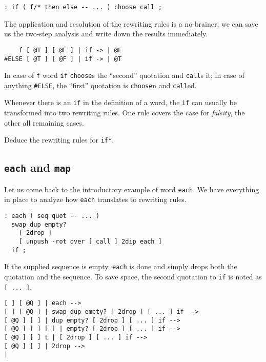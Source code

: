 \begin{verbatim}
: if ( f/* then else -- ... ) choose call ;
\end{verbatim}

The application and resolution of the rewriting rules is a no-brainer; we can save us the two-step analysis and write down the results immediately.

\begin{verbatim}
    f [ @T ] [ @F ] | if -> | @F
#ELSE [ @T ] [ @F ] | if -> | @T
\end{verbatim}

In case of \verb|f| word \verb|if| \verb|choose|s the ``second'' quotation and \verb|call|s it; in case of anything \verb|#ELSE|, the ``first'' quotation is \verb|choose|n and \verb|call|ed.

Whenever there is an \verb|if| in the definition of a word, the \verb|if| can usually be transformed into two rewriting rules. One rule covers the case for \emph{falsity}, the other all remaining cases.

\begin{exercise}\label{ex:if*}
Deduce the rewriting rules for \verb|if*|.
\end{exercise}

\subsection{\texttt{each} and \texttt{map}}

Let us come back to the introductory example of word \verb|each|. We have everything in place to analyze how \verb|each| translates to rewriting rules.

\begin{verbatim}
: each ( seq quot -- ... )
  swap dup empty?
    [ 2drop ]
    [ unpush -rot over [ call ] 2dip each ]
  if ;
\end{verbatim}

If the supplied sequence is empty, \verb|each| is done and simply drops both the quotation and the sequence. To save space, the second quotation to \verb|if| is noted as \verb|[ ... ]|.

\begin{verbatim}
[ ] [ @Q ] | each -->
[ ] [ @Q ] | swap dup empty? [ 2drop ] [ ... ] if -->
[ @Q ] [ ] | dup empty? [ 2drop ] [ ... ] if -->
[ @Q ] [ ] [ ] | empty? [ 2drop ] [ ... ] if -->
[ @Q ] [ ] t | [ 2drop ] [ ... ] if -->
[ @Q ] [ ] | 2drop -->
|
\end{verbatim}

